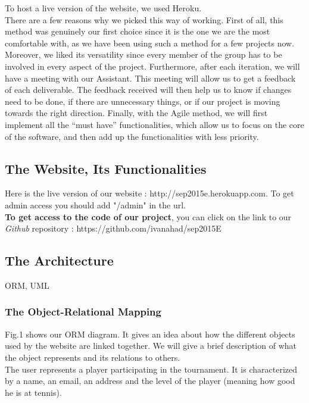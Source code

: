 \documentclass[a4paper, 12pt]{article}
\begin{document}
To host a live version of the website, we used Heroku.\\

There are a few reasons why we picked this way of working. First of all, this method was genuinely our first choice since it is the one we are the most comfortable with, as we have been using such a method for a few projects now. Moreover, we liked its versatility since every member of the group has to be involved in every aspect of the project. Furthermore, after each iteration, we will have a meeting with our Assistant. This meeting will allow us to get a feedback of each deliverable. The feedback received will then help us to know if changes need to be done, if there are unnecessary things, or if our project is moving towards the right direction. Finally, with the Agile method, we will first implement all the “must have” functionalities, which allow us to focus on the core of the software, and then add up the functionalities with less priority. \\
\subsection{The Website, Its Functionalities}

Here is the live version of our website : http://sep2015e.herokuapp.com.  To get admin access you should add "/admin" in the url.\\

\textbf{To get access to the code of our project}, you can click on the link to our \textit{Github} repository : https://github.com/ivanahad/sep2015E\\

\subsection{The Architecture}
ORM, UML 

\subsubsection{The Object-Relational Mapping}
Fig.1 shows our ORM diagram. It gives an idea about how the different objects used by the website are linked together. We will give a brief description of what the object represents and its relations to others.\\

The user represents a player participating in the tournament. It is characterized by a name, an email, an address and the level of the player (meaning how good he is at tennis).\\
\end{document}
